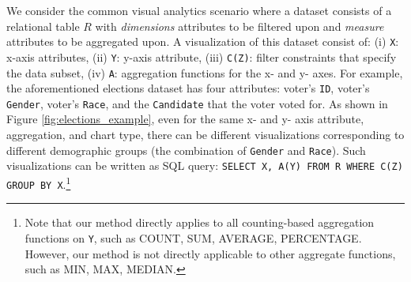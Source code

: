\npar {} We consider the common visual analytics scenario where a dataset consists of a relational table $R$ with \textit{dimensions} attributes to be filtered upon and \textit{measure} attributes to be aggregated upon. A visualization of this dataset consist of: (i) {\tt X}: x-axis attributes, (ii) {\tt Y}: y-axis attribute, (iii) {\tt C(Z)}: filter constraints that specify the data subset, (iv) {\tt A}: aggregation functions for the x- and y- axes. For example, the aforementioned elections dataset has four attributes: voter's {\tt ID}, voter's {\tt Gender}, voter's {\tt Race}, and the {\tt Candidate} that the voter voted for. As shown in Figure \ref{fig:elections_example}, even for the same x- and y- axis attribute, aggregation, and chart type, there can be different visualizations corresponding to different demographic groups (the combination of {\tt Gender} and {\tt Race}). Such visualizations can be written as \textsc{SQL} query: {\tt SELECT X, A(Y) FROM R WHERE C(Z) GROUP BY X}.\footnote{Note that our method directly applies to all counting-based aggregation functions on {\tt Y}, such as \textsc{COUNT}, \textsc{SUM}, \textsc{AVERAGE}, \textsc{PERCENTAGE}. However, our method is not directly applicable to other aggregate functions, such as \textsc{MIN}, \textsc{MAX}, \textsc{MEDIAN}.}
